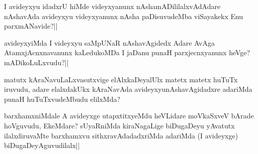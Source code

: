 
\begin{artha}
I avideyxyu idadxrU hiMde videyxyanunx nAshamADililalxvAdAdare nAshavAda avideyxyu videyxyanunx nAsha paDisuvudeMba viSayakekx Enu parxmANavide?||
\end{artha}

\begin{artha}
avideyxyiMda I videyxyu saMpUNaR nAshavAgidedx Adare AvAga AtamxjAcnxnavanunx kaLedukoMDa I jaDanu punaH parxjecnxyanunx heVge? mADikoLuLxvudu?||
\end{artha}

\begin{artha}
matutx kAraNavuLaLxvasutxvige elAlxkaDeyalUlx matetx matetx huTuTx iruvudu, adare elalxdakUkx kAraNavAda avideyxyunAshavAgidadxre adariMda punaH huTuTxvudeMbudu elilxMda?
\end{artha}

\begin{artha}
barxhamxniMdale A avideyxge utapxtitxyeMdu heVLidare moVkaSxveV bArade hoVguvudu, EkeMdare? sUyaRniMda kiraNagaLige biDugaDeyu yAvatutx ilalxdiruvaMte barxhamxvu sithxravAdadadxriMda adariMda (I avideyxge) biDugaDeyAguvudilalx||
\end{artha}
